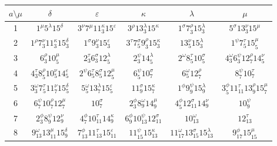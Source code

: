 \documentclass[a4paper,12pt]{report}
\begin{document}
\begin{center}
\begin{tabular}{|c|c|c|c|c|c|}\hline
 $ a\setminus\mu$    & $\delta$ &$\varepsilon$  & $\kappa$ & $\lambda$ & $\mu$ \\ \hline
1 & $1^{\mu}5^{\lambda}15^{\delta}$ & $3^{\nu}7^{\mu}11_{3}^{\kappa}15^{\varepsilon}$ & $3^{\rho}13_{3}^{\lambda}15^{\kappa}$& $1^{\sigma}7_{3}^{\rho}15_{3}^{\lambda}$ & $5^{\sigma}13_{3}^{\nu}15^{\mu}$\\
\hline

2 &
$1^{\rho}7_{3}^{\nu}11_{3}^{\kappa}15_{3}^{\delta}$ &$1^{\sigma}9_{3}^{\nu}15_{3}^{\varepsilon}$& $3^{\tau}7_{5}^{\sigma}9_{3}^{\rho}15_{3}^{\kappa}$ & $13_{5}^{\nu}15_{3}^{\lambda}$ &$1^{\psi}7_{5}^{\tau}15_{5}^{\mu}$  \\
\hline

3 & $6_{3}^{\rho}10_{5}^{\mu}$ & $2_{3}^{\tau}6_{3}^{\sigma}12_{5}^{\lambda}$ & $2_{3}^{\psi}14_{5}^{\lambda}$ & $2^{\omega}8_{5}^{\tau}10_{5}^{\sigma}$ & $4_{3}^{\omega}6_{3}^{\psi}12_{7}^{\rho}14_{5}^{\nu}$  \\
\hline

4 &
$4_{3}^{\tau}8_{5}^{\rho}10_{5}^{\nu}14_{5}^{\varepsilon}$  & $2^{\psi}6_{5}^{\tau}8_{5}^{\sigma}12_{5}^{\mu}$& $6_{5}^{\psi}10_{7}^{\sigma}$& $6_{5}^{\omega}12_{7}^{\rho}$ & $8_{7}^{\psi}10_{7}^{\tau}$ \\
\hline

5 & $3_{3}^{\omega}7_{5}^{\tau}11_{7}^{\nu}15_{5}^{\delta}$ & $5_{5}^{\omega}13_{7}^{\lambda}15_{5}^{\varepsilon}$& $11_{9}^{\sigma}15_{7}^{\kappa}$ & $1^{\phi}9_{9}^{\psi}15_{9}^{\lambda}$ & $3_{5}^{\phi}11_{11}^{\tau}13_{9}^{\rho}15_{7}^{\mu}$   \\
\hline

6 & $6_{7}^{\psi}10_{7}^{\rho}12_{7}^{\mu}$ & $10_{7}^{\sigma}$& $2_{3}^{\phi}8_{9}^{\omega}14_{9}^{\mu}$&
$4_{5}^{\phi}12_{11}^{\sigma}14_{9}^{\nu}$ & $10_{9}^{\psi}$
\\ \hline

7  & $2_{3}^{\phi}8_{9}^{\psi}12_{9}^{\nu}$ & $4_{7}^{\phi}10_{11}^{\tau}14_{9}^{\kappa}$ & $6_{9}^{\phi}10_{13}^{\psi}12_{11}^{\sigma}$ & $10_{13}^{\omega}$ & $12_{13}^{\tau}$  \\
\hline

8 & $9_{13}^{\omega}13_{11}^{\mu}15_{9}^{\delta}$ & $7_{13}^{\phi}11_{13}^{\tau}15_{11}^{\varepsilon}$& $11_{15}^{\psi}15_{13}^{\kappa}$ & $11_{17}^{\omega}13_{15}^{\sigma}15_{13}^{\lambda}$ & $9_{17}^{\phi}15_{15}^{\mu}$   \\
\hline
  \end{tabular}




\end{center}
\end{document}
